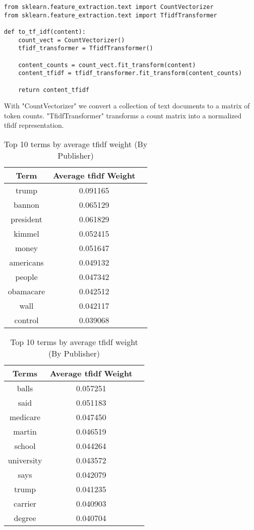 \documentclass[a4paper, 11pt,titlepage,oneside,openany]{book}
\begin{document}
\noindent
\begin{minipage}{\linewidth}
\begin{lstlisting}[frame=single]
from sklearn.feature_extraction.text import CountVectorizer
from sklearn.feature_extraction.text import TfidfTransformer

def to_tf_idf(content):
	count_vect = CountVectorizer()
	tfidf_transformer = TfidfTransformer()

	content_counts = count_vect.fit_transform(content)
	content_tfidf = tfidf_transformer.fit_transform(content_counts)

	return content_tfidf
\end{lstlisting}
\end{minipage}

\noindent With "CountVectorizer" we convert a collection of text documents to a matrix of token counts. "TfidfTransformer" transforms a count matrix into a normalized \gls{tfidf} representation.
\begin{table}[t]
	\begin{minipage}{.5\textwidth}
		\begin{tabular}{ccc}
			\toprule
			Term & Average \Gls{tfidf} Weight \\
			\midrule
			trump & 0.091165 \\
			bannon & 0.065129 \\
			president & 0.061829 \\
			kimmel & 0.052415 \\
			money & 0.051647 \\
			americans & 0.049132 \\
			people & 0.047342 \\
			obamacare & 0.042512 \\
			wall & 0.042117 \\
			control & 0.039068 \\
			\bottomrule
		\end{tabular}
		\caption{Top 10 terms by average \Gls{tfidf} weight (By Article)}
	\end{minipage}
	\hspace{0,8cm}
	\begin{minipage}{.5\textwidth}
		\begin{tabular}{ccc}
			\toprule
			Terms & Average \Gls{tfidf} Weight \\
			\midrule
			balls & 0.057251 \\
			said & 0.051183 \\
			medicare & 0.047450 \\
			martin & 0.046519 \\
			school & 0.044264 \\
			university & 0.043572 \\
			says & 0.042079 \\
			trump & 0.041235 \\
			carrier & 0.040903 \\
			degree & 0.040704 \\
			\bottomrule
		\end{tabular}
		\caption{Top 10 terms by average \Gls{tfidf} weight (By Publisher)}
	\end{minipage}
\end{table}
\end{document}
